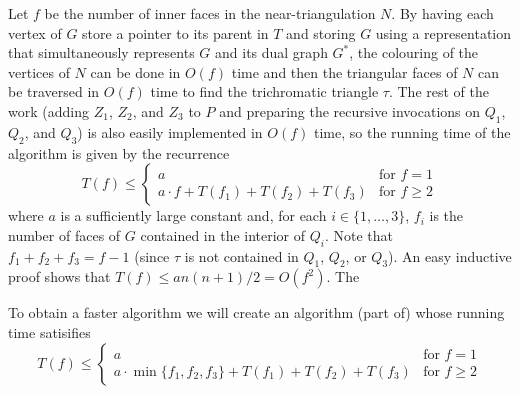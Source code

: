 \documentclass[kpfonts]{patmorin}
\let\le\leqslant
\let\ge\geqslant
\begin{document}
Let $f$ be the number of inner faces in the near-triangulation $N$.  By having each vertex of $G$ store a pointer to its parent in $T$ and storing $G$ using a representation that simultaneously represents $G$ and its dual graph $G^*$, the colouring of the vertices of $N$ can be done in $O(f)$ time and then the triangular faces of $N$ can be traversed in $O(f)$ time to find the trichromatic triangle $\tau$. The rest of the work (adding $Z_1$, $Z_2$, and $Z_3$ to $P$ and preparing the recursive invocations on $Q_1$, $Q_2$, and $Q_3$) is also easily implemented in $O(f)$ time, so the running time of the algorithm is given by the recurrence
\[  T(f) \le \begin{cases}
           a & \text{for $f=1$} \\
           a\cdot f + T(f_1)+T(f_2)+T(f_3) & \text{for $f\ge 2$}
         \end{cases}
 \]
where $a$ is a sufficiently large constant and, for each $i\in\{1,\ldots,3\}$, $f_i$ is the number of faces of $G$ contained in the interior of $Q_i$.
Note that $f_1+f_2+f_3=f-1$ (since $\tau$ is not contained in $Q_1$, $Q_2$, or $Q_3$).  An easy inductive proof shows that $T(f) \le an(n+1)/2 = O(f^2)$.  The

To obtain a faster algorithm we will create an algorithm (part of) whose running time satisifies
\[  T(f) \le \begin{cases}
           a & \text{for $f=1$} \\
           a\cdot \min\{f_1,f_2,f_3\} + T(f_1)+T(f_2)+T(f_3) & \text{for $f\ge 2$}
         \end{cases}
 \]
\end{document}
